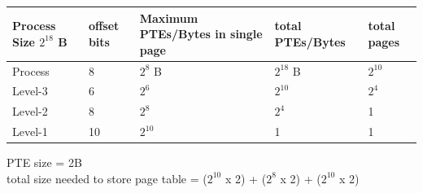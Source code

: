 \begin{enumerate}
    \begin{myTableStyle}
      \begin{tabular}{ |m{2cm}|m{2cm}|m{2cm}|m{2cm}|m{2cm}| } \hline
          Process Size \(2^{18}\) B  & offset bits & Maximum PTEs/Bytes in single page & total PTEs/Bytes  & total pages\\ \hline
          Process   &   8   &  \(2^8\) B      &   \(2^{18}\) B&   \(2^{10}\)    \\ \hline
          Level-3   &   6   &  \(2^6\)        &   \(2^{10}\)  &   \(2^{4}\)     \\ \hline
          Level-2   &   8   &  \(2^8\)        &   \(2^{4}\)   &   1             \\ \hline
          Level-1   &   10  &  \(2^{10}\)     &   1           &   1             \\ \hline
      \end{tabular}
    \end{myTableStyle}

    PTE size =  2B \\
    total size needed to store page table = (\(2^{10}\) x 2)  + (\(2^{8}\) x 2)  + (\(2^{10}\) x 2)
    \vspace{0.08in}






\end{enumerate}








